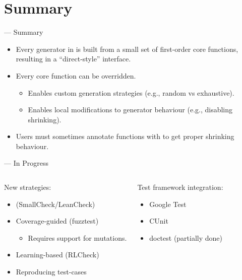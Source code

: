 \section{Summary}

\begin{frame}{\halcheck{} --- Summary}
  \begin{itemize}
    \item Every generator in \halcheck{} is built from a small set of first-order core functions, resulting in a ``direct-style'' interface.
    \item Every core function can be overridden.
    \begin{itemize}
      \item Enables custom generation strategies (e.g., random vs exhaustive).
      \item Enables local modifications to generator behaviour (e.g., disabling shrinking).
    \end{itemize}
    \item Users must sometimes annotate functions with  to get proper shrinking behaviour.
  \end{itemize}
\end{frame}

\begin{frame}{\halcheck{} --- In Progress}
  \begin{columns}[T,onlytextwidth]
    \begin{block}{New strategies:}
      \begin{itemize}
        \item {} (SmallCheck/LeanCheck)
        \item Coverage-guided (fuzztest)
              \begin{itemize}
                \item Requires support for \alert{mutations}.
              \end{itemize}
        \item Learning-based (RLCheck)
        \item Reproducing test-cases
      \end{itemize}
    \end{block}

    \begin{block}{Test framework integration:}
      \begin{itemize}
        \item Google Test
        \item CUnit
        \item doctest (partially done)
      \end{itemize}
    \end{block}
  \end{columns}
\end{frame}
